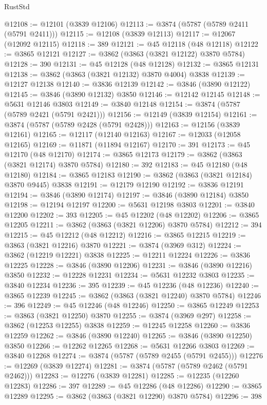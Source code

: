 \begin{lexlean}{RustStd}
\begin{coremodule}
@12108 := @12101 (@3839 @12106)
@12113 := @3874 (@5787 (@5789 @2411 (@5791 @2411)))
@12115 := @12108 (@3839 @12113)
@12117 := @12067 (@12092 @12115)
@12118 := 389
@12121 := @45 @12118 (@48 @12118)
@12122 := @3865 @12121
@12127 := @3862 (@3863 (@3821 @12122) @3870 @5784)
@12128 := 390
@12131 := @45 @12128 (@48 @12128)
@12132 := @3865 @12131
@12138 := @3862 (@3863 (@3821 @12132) @3870 @4004) @3838
@12139 := @12127 @12138
@12140 := @3836 @12139
@12142 := @3846 (@3890 @12122)
@12145 := @3846 (@3890 @12132) @3850
@12146 := @12142 @12145
@12148 := @5631 @12146 @3803
@12149 := @3840 @12148
@12154 := @3874 (@5787 (@5789 @2421 (@5791 @2421)))
@12156 := @12149 (@3839 @12154)
@12161 := @3874 (@5787 (@5789 @2428 (@5791 @2428)))
@12163 := @12156 (@3839 @12161)
@12165 := @12117 (@12140 @12163)
@12167 := @12033 (@12058 @12165)
@12169 := @11871 (@11894 @12167)
@12170 := 391
@12173 := @45 @12170 (@48 @12170)
@12174 := @3865 @12173
@12179 := @3862 (@3863 (@3821 @12174) @3870 @5784)
@12180 := 392
@12183 := @45 @12180 (@48 @12180)
@12184 := @3865 @12183
@12190 := @3862 (@3863 (@3821 @12184) @3870 @9445) @3838
@12191 := @12179 @12190
@12192 := @3836 @12191
@12194 := @3846 (@3890 @12174)
@12197 := @3846 (@3890 @12184) @3850
@12198 := @12194 @12197
@12200 := @5631 @12198 @3803
@12201 := @3840 @12200
@12202 := 393
@12205 := @45 @12202 (@48 @12202)
@12206 := @3865 @12205
@12211 := @3862 (@3863 (@3821 @12206) @3870 @5784)
@12212 := 394
@12215 := @45 @12212 (@48 @12212)
@12216 := @3865 @12215
@12219 := @3863 (@3821 @12216) @3870
@12221 := @3874 (@3969 @312)
@12224 := @3862 (@12219 @12221) @3838
@12225 := @12211 @12224
@12226 := @3836 @12225
@12228 := @3846 (@3890 @12206)
@12231 := @3846 (@3890 @12216) @3850
@12232 := @12228 @12231
@12234 := @5631 @12232 @3803
@12235 := @3840 @12234
@12236 := 395
@12239 := @45 @12236 (@48 @12236)
@12240 := @3865 @12239
@12245 := @3862 (@3863 (@3821 @12240) @3870 @5784)
@12246 := 396
@12249 := @45 @12246 (@48 @12246)
@12250 := @3865 @12249
@12253 := @3863 (@3821 @12250) @3870
@12255 := @3874 (@3969 @297)
@12258 := @3862 (@12253 @12255) @3838
@12259 := @12245 @12258
@12260 := @3836 @12259
@12262 := @3846 (@3890 @12240)
@12265 := @3846 (@3890 @12250) @3850
@12266 := @12262 @12265
@12268 := @5631 @12266 @3803
@12269 := @3840 @12268
@12274 := @3874 (@5787 (@5789 @2455 (@5791 @2455)))
@12276 := @12269 (@3839 @12274)
@12281 := @3874 (@5787 (@5789 @2462 (@5791 @2462)))
@12283 := @12276 (@3839 @12281)
@12285 := @12235 (@12260 @12283)
@12286 := 397
@12289 := @45 @12286 (@48 @12286)
@12290 := @3865 @12289
@12295 := @3862 (@3863 (@3821 @12290) @3870 @5784)
@12296 := 398

\end{coremodule}
\end{lexlean}
